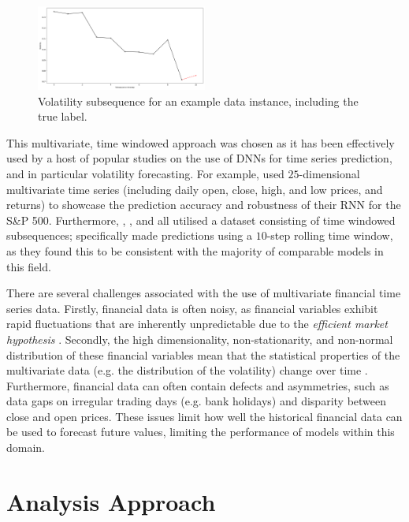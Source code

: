 \documentclass[a4paper, 11pt]{report}
\begin{document}
    \begin{figure}[ht]
        \centering
        \includegraphics[width=0.5\textwidth]{volatility-subsequence.png}
        \caption{\centering Volatility subsequence for an example data instance, including the true label.}
        \label{fig: volatility-subsequence}
    \end{figure}


    This multivariate, time windowed approach was chosen as it has been effectively used by a host of popular studies on the use of DNNs for time series prediction, and in particular volatility forecasting. For example, \citet{xiong-2016} used $25$-dimensional multivariate time series (including daily open, close, high, and low prices, and returns) to showcase the prediction accuracy and robustness of their RNN for the S\&P 500. Furthermore, \citet{xiong-2016}, \citet{bucci-2020}, and \citet{rodikov-2022} all utilised a dataset consisting of time windowed subsequences; \citet{xiong-2016} specifically made predictions using a $10$-step rolling time window, as they found this to be consistent with the majority of comparable models in this field.

    There are several challenges associated with the use of multivariate financial time series data. Firstly, financial data is often noisy, as financial variables exhibit rapid fluctuations that are inherently unpredictable due to the \emph{efficient market hypothesis} \citep{cavalcante-2016}. Secondly, the high dimensionality, non-stationarity, and non-normal distribution of these financial variables mean that the statistical properties of the multivariate data (e.g. the distribution of the volatility) change over time \citep{fryzlewicz-2019}. Furthermore, financial data can often contain defects and asymmetries, such as data gaps on irregular trading days (e.g. bank holidays) and disparity between close and open prices. These issues limit how well the historical financial data can be used to forecast future values, limiting the performance of models within this domain.


    \section{Analysis Approach}
    \label{section: metrics}
\end{document}
